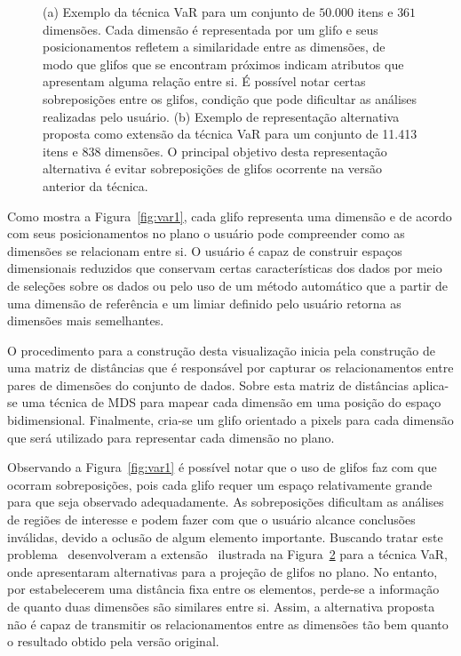 \begin{figure}[h!]
\begin{subfigure}[b]{0.475\textwidth}
    \caption{}
    \label{fig:var2}
  \end{subfigure}
  \caption[VaR: Value and Relation]{(a) Exemplo da técnica
  VaR para um conjunto de $50.000$ itens e $361$ dimensões.
  Cada dimensão é representada por um glifo e seus
  posicionamentos refletem a similaridade entre as
  dimensões, de modo que glifos que se encontram próximos
  indicam atributos que apresentam alguma relação entre si.
  É possível notar certas sobreposições entre os glifos,
  condição que pode dificultar as análises realizadas pelo
  usuário. (b) Exemplo de representação alternativa proposta
  como extensão da técnica VaR para um conjunto de 11.413
  itens e 838 dimensões. O principal objetivo desta
  representação alternativa é evitar sobreposições de glifos
  ocorrente na versão anterior da técnica.}
\end{figure}

Como mostra a Figura~\ref{fig:var1}, cada glifo representa
uma dimensão e de acordo com seus posicionamentos no plano o
usuário pode compreender como as dimensões se relacionam
entre si.  O usuário é capaz de construir espaços
dimensionais reduzidos que conservam certas características
dos dados por meio de seleções sobre os dados ou pelo uso de
um método automático que a partir de uma dimensão de
referência e um limiar definido pelo usuário retorna as
dimensões mais semelhantes.

O procedimento para a construção desta visualização inicia
pela construção de uma matriz de distâncias que é
responsável por capturar os relacionamentos entre pares de
dimensões do conjunto de dados.  Sobre esta matriz de
distâncias aplica-se uma técnica de MDS para mapear cada
dimensão em uma posição do espaço bidimensional.
Finalmente, cria-se um glifo orientado a pixels para cada
dimensão que será utilizado para representar cada dimensão
no plano.

Observando a Figura~\ref{fig:var1} é possível notar que o
uso de glifos faz com que ocorram sobreposições, pois cada
glifo requer um espaço relativamente grande para que seja
observado adequadamente.  As sobreposições dificultam as
análises de regiões de interesse e podem fazer com que o
usuário alcance conclusões inválidas, devido a oclusão de
algum elemento importante.  Buscando tratar este
problema~\citeauthor{Yang2007} desenvolveram a
extensão~\cite{Yang2007} ilustrada na Figura~\ref{fig:var2}
para a técnica VaR, onde apresentaram alternativas para a
projeção de glifos no plano. No entanto, por estabelecerem
uma distância fixa entre os elementos, perde-se a informação
de quanto duas dimensões são similares entre si. Assim, a
alternativa proposta não é capaz de transmitir os
relacionamentos entre as dimensões tão bem quanto o
resultado obtido pela versão original.

